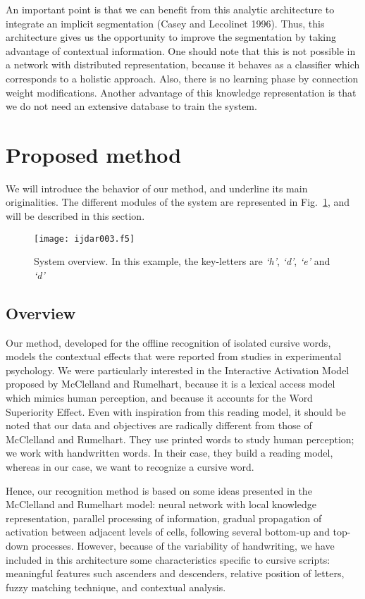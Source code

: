 \documentclass[ijdar]{svjour}
\begin{document}
An important point is that we can benefit from this analytic architecture to integrate an implicit segmentation (Casey and Lecolinet 1996).
Thus, this architecture gives us the opportunity to improve the segmentation by taking advantage of contextual information.
One should note that this is not possible in a network with distributed representation, because it behaves as a classifier which corresponds to a holistic approach.
Also, there is no learning phase by connection weight modifications.
Another advantage of this knowledge representation is that we do not need an extensive database to train the system.


\section{Proposed method}
\label{METHOD}

We will introduce the behavior of our method, and underline its main originalities.
The different modules of the system are represented in Fig.~\ref{FIGOVERVIEW}, and will be described in this section.

\begin{figure}%
\texttt{[image: ijdar003.f5]}%
\caption{System overview. In this example, the key-letters are {\it
`h'}, {\it `d'}, {\it `e'} and {\it `d'}}
\label{FIGOVERVIEW}
\end{figure}

\subsection{Overview}

Our method, developed for the offline recognition of isolated cursive words, models the contextual effects that were reported from studies in experimental psychology.
We were particularly interested in the Interactive Activation Model proposed by McClelland and Rumelhart, because it is a lexical access model which mimics human perception, and because it accounts for the Word Superiority Effect.
Even with inspiration from this reading model, it should be noted that our data and objectives are radically different from those of McClelland and Rumelhart.
They use printed words to study human perception; we work with handwritten words.
In their case, they build a reading model, whereas in our case, we want to recognize a cursive word.

Hence, our recognition method is based on some ideas presented in the McClelland and Rumelhart model: neural network with local knowledge representation, parallel processing of information, gradual propagation of activation between adjacent levels of cells, following several bottom-up and top-down processes.
However, because of the variability of handwriting, we have included in this architecture some characteristics specific to cursive scripts: meaningful features such ascenders and descenders, relative position of letters, fuzzy matching
technique, and contextual analysis.
\end{document}
